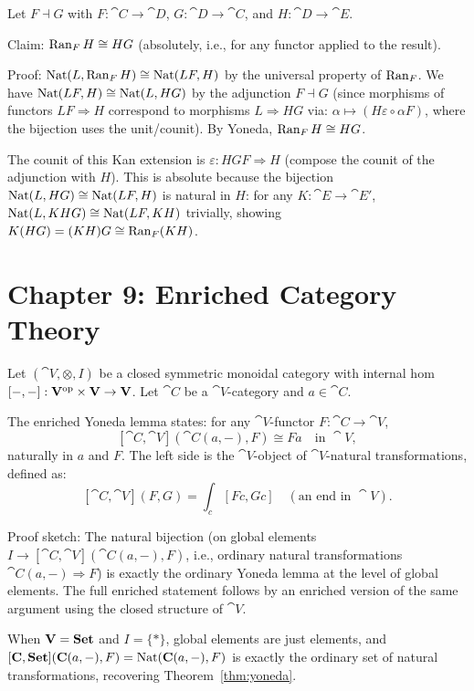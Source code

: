 \begin{exercise}
Let $F \dashv G$ with $F: \cat{C} \to \cat{D}$, $G: \cat{D} \to \cat{C}$, and $H: \cat{D} \to \cat{E}$.

Claim: $\operatorname{Ran}_F H \cong HG$ (absolutely, i.e., for any functor applied to the result).

Proof: $\operatorname{Nat}(L, \operatorname{Ran}_F H) \cong \operatorname{Nat}(LF, H)$ by the universal property of $\operatorname{Ran}_F$. We have $\operatorname{Nat}(LF, H) \cong \operatorname{Nat}(L, HG)$ by the adjunction $F \dashv G$ (since morphisms of functors $LF \Rightarrow H$ correspond to morphisms $L \Rightarrow HG$ via: $\alpha \mapsto (H\varepsilon \circ \alpha F)$, where the bijection uses the unit/counit). By Yoneda, $\operatorname{Ran}_F H \cong HG$.

The counit of this Kan extension is $\varepsilon: HGF \Rightarrow H$ (compose the counit of the adjunction with $H$). This is absolute because the bijection $\operatorname{Nat}(L, HG) \cong \operatorname{Nat}(LF, H)$ is natural in $H$: for any $K: \cat{E} \to \cat{E}'$, $\operatorname{Nat}(L, KHG) \cong \operatorname{Nat}(LF, KH)$ trivially, showing $K(HG) = (KH)G \cong \operatorname{Ran}_F(KH)$.
\end{exercise}

\section*{Chapter 9: Enriched Category Theory}

\begin{exercise}
Let $(\cat{V}, \otimes, I)$ be a closed symmetric monoidal category with internal hom $[-,-]: \mathbf{V}^{\mathrm{op}} \times \mathbf{V} \to \mathbf{V}$. Let $\cat{C}$ be a $\cat{V}$-category and $a \in \cat{C}$.

The enriched Yoneda lemma states: for any $\cat{V}$-functor $F: \cat{C} \to \cat{V}$,
\[
  [\cat{C}, \cat{V}](\cat{C}(a,-), F) \cong Fa \quad \text{in } \cat{V},
\]
naturally in $a$ and $F$. The left side is the $\cat{V}$-object of $\cat{V}$-natural transformations, defined as:
\[
  [\cat{C},\cat{V}](F,G) = \int_c [Fc, Gc] \quad (\text{an end in } \cat{V}).
\]

Proof sketch: The natural bijection (on global elements $I \to [\cat{C},\cat{V}](\cat{C}(a,-),F)$, i.e., ordinary natural transformations $\cat{C}(a,-) \Rightarrow F$) is exactly the ordinary Yoneda lemma at the level of global elements. The full enriched statement follows by an enriched version of the same argument using the closed structure of $\cat{V}$.

When $\mathbf{V} = \mathbf{Set}$ and $I = \{*\}$, global elements are just elements, and $[\mathbf{C},\mathbf{Set}](\mathbf{C}(a,-), F) = \operatorname{Nat}(\mathbf{C}(a,-), F)$ is exactly the ordinary set of natural transformations, recovering Theorem~\ref{thm:yoneda}.
\end{exercise}

